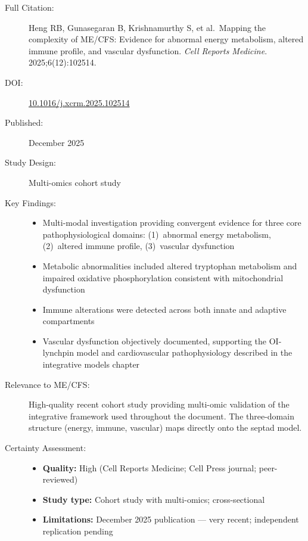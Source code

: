 \begin{description}
    \item[Full Citation:] Heng RB, Gunasegaran B, Krishnamurthy S, et al.\ Mapping the complexity of ME/CFS: Evidence for abnormal energy metabolism, altered immune profile, and vascular dysfunction. \textit{Cell Reports Medicine}. 2025;6(12):102514.
    \item[DOI:] \href{https://doi.org/10.1016/j.xcrm.2025.102514}{10.1016/j.xcrm.2025.102514}
    \item[Published:] December 2025
    \item[Study Design:] Multi-omics cohort study
    \item[Key Findings:]
    \begin{itemize}
        \item Multi-modal investigation providing convergent evidence for three core pathophysiological domains: (1)~abnormal energy metabolism, (2)~altered immune profile, (3)~vascular dysfunction
        \item Metabolic abnormalities included altered tryptophan metabolism and impaired oxidative phosphorylation consistent with mitochondrial dysfunction
        \item Immune alterations were detected across both innate and adaptive compartments
        \item Vascular dysfunction objectively documented, supporting the OI-lynchpin model and cardiovascular pathophysiology described in the integrative models chapter
    \end{itemize}
    \item[Relevance to ME/CFS:] High-quality recent cohort study providing multi-omic validation of the integrative framework used throughout the document. The three-domain structure (energy, immune, vascular) maps directly onto the septad model.
    \item[Certainty Assessment:]
    \begin{itemize}
        \item \textbf{Quality:} High (Cell Reports Medicine; Cell Press journal; peer-reviewed)
        \item \textbf{Study type:} Cohort study with multi-omics; cross-sectional
        \item \textbf{Limitations:} December 2025 publication --- very recent; independent replication pending
    \end{itemize}
\end{description}

